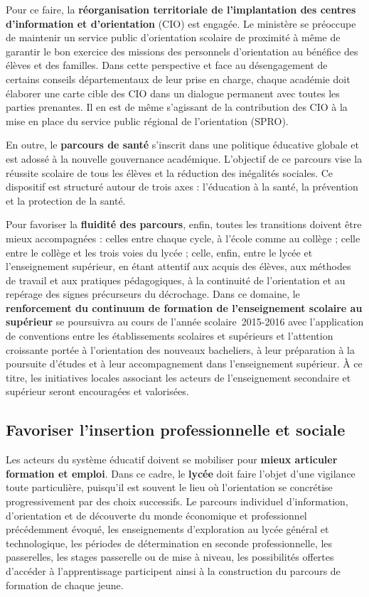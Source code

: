 Pour ce faire, la \textbf{réorganisation territoriale de l’implantation des centres d’information et d’orientation} (CIO) est engagée. Le ministère se préoccupe de maintenir un service public d’orientation scolaire de proximité à même de garantir le bon exercice des missions des personnels d’orientation au bénéfice des élèves et des familles. Dans cette perspective et face au désengagement de certains conseils départementaux de leur prise en charge, chaque académie doit élaborer une carte cible des CIO dans un dialogue permanent avec toutes les parties prenantes. Il en est de même s’agissant de la contribution des CIO à la mise en place du service public régional de l’orientation (SPRO).

En outre, le \textbf{parcours de santé} s’inscrit dans une politique éducative globale et est adossé à la nouvelle gouvernance académique. L’objectif de ce parcours vise la réussite scolaire de tous les élèves et la réduction des inégalités sociales. Ce dispositif est structuré autour de trois axes : l’éducation à la santé, la prévention et la protection de la santé.

Pour favoriser la \textbf{fluidité des parcours}, enfin, toutes les transitions doivent être mieux accompagnées : celles entre chaque cycle, à l’école comme au collège ; celle entre le collège et les trois voies du lycée ; celle, enfin, entre le lycée et l’enseignement supérieur, en étant attentif aux acquis des élèves, aux méthodes de travail et aux pratiques pédagogiques, à la continuité de l’orientation et au repérage des signes précurseurs du décrochage. Dans ce domaine, le \textbf{renforcement du continuum de formation de l’enseignement scolaire au supérieur} se poursuivra au cours de l’année scolaire~2015-2016 avec l’application de conventions entre les établissements scolaires et supérieurs et l’attention croissante portée à l’orientation des nouveaux bacheliers, à leur préparation à la poursuite d’études et à leur accompagnement dans l’enseignement supérieur. À ce titre, les initiatives locales associant les acteurs de l’enseignement secondaire et supérieur seront encouragées et valorisées.

\subsection{Favoriser l’insertion professionnelle et sociale}
Les acteurs du système éducatif doivent se mobiliser pour \textbf{mieux articuler formation et emploi}. Dans ce cadre, le \textbf{lycée} doit faire l’objet d’une vigilance toute particulière, puisqu’il est souvent le lieu où l’orientation se concrétise progressivement par des choix successifs. Le parcours individuel d’information, d’orientation et de découverte du monde économique et professionnel précédemment évoqué, les enseignements d’exploration au lycée général et technologique, les périodes de détermination en seconde professionnelle, les passerelles, les stages passerelle ou de mise à niveau, les possibilités offertes d’accéder à l’apprentissage participent ainsi à la construction du parcours de formation de chaque jeune.

